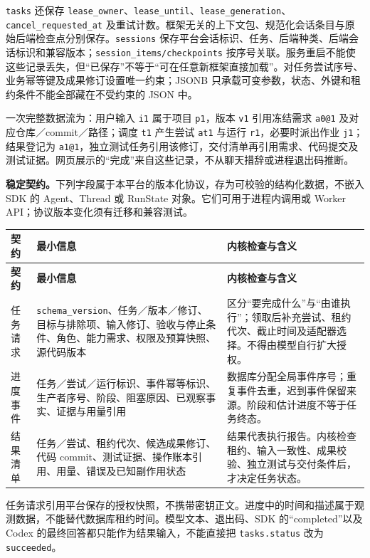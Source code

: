 \documentclass[11pt,a4paper]{article}
\begin{document}
\texttt{tasks} 还保存 \texttt{lease\_owner}、\texttt{lease\_until}、\texttt{lease\_generation}、\texttt{cancel\_requested\_at} 及重试计数。框架无关的上下文包、规范化会话条目与原始后端检查点分别保存。\texttt{sessions} 保存平台会话标识、任务、后端种类、后端会话标识和兼容版本；\texttt{session\_items/checkpoints} 按序号关联。服务重启不能使这些记录丢失，但“已保存”不等于“可在任意新框架直接加载”。对任务尝试序号、业务幂等键及成果修订设置唯一约束；JSONB 只承载可变参数，状态、外键和租约条件不能全部藏在不受约束的 JSON 中。

一次完整数据流为：用户输入 \texttt{i1} 属于项目 \texttt{p1}，版本 \texttt{v1} 引用冻结需求 \texttt{a0@1} 及对应仓库／commit／路径；调度 \texttt{t1} 产生尝试 \texttt{at1} 与运行 \texttt{r1}，必要时派出作业 \texttt{j1}；结果登记为 \texttt{a1@1}，独立测试任务引用该修订，交付清单再引用需求、代码提交及测试证据。网页展示的“完成”来自这些记录，不从聊天措辞或进程退出码推断。

\textbf{稳定契约。}下列字段属于本平台的版本化协议，存为可校验的结构化数据，不嵌入 SDK 的 Agent、Thread 或 RunState 对象。它们可用于进程内调用或 Worker API；协议版本变化须有迁移和兼容测试。

\begingroup\small
\begin{longtable}{P{2.0cm}P{6.2cm}P{6.5cm}}
\toprule\textbf{契约} & \textbf{最小信息} & \textbf{内核检查与含义}\\\midrule\endfirsthead
\toprule\textbf{契约} & \textbf{最小信息} & \textbf{内核检查与含义}\\\midrule\endhead
任务请求 & \texttt{schema\_version}、任务／版本／修订、目标与排除项、输入修订、验收与停止条件、角色、能力需求、权限及预算快照、源代码版本 & 区分“要完成什么”与“由谁执行”；领取后补充尝试、租约代次、截止时间及适配器选择。不得由模型自行扩大授权。\\
进度事件 & 任务／尝试／运行标识、事件幂等标识、生产者序号、阶段、阻塞原因、已观察事实、证据与用量引用 & 数据库分配全局事件序号；重复事件去重，迟到事件保留来源。阶段和估计进度不等于任务终态。\\
结果清单 & 任务／尝试、租约代次、候选成果修订、代码 commit、测试证据、操作账本引用、用量、错误及已知副作用状态 & 结果代表执行报告。内核检查租约、输入一致性、成果校验、独立测试与交付条件后，才决定任务状态。\\
\bottomrule
\end{longtable}
\endgroup

任务请求引用平台保存的授权快照，不携带密钥正文。进度中的时间和描述属于观测数据，不能替代数据库租约时间。模型文本、退出码、SDK 的“completed”以及 Codex 的最终回答都只能作为结果输入，不能直接把 \texttt{tasks.status} 改为 \texttt{succeeded}。
\end{document}
